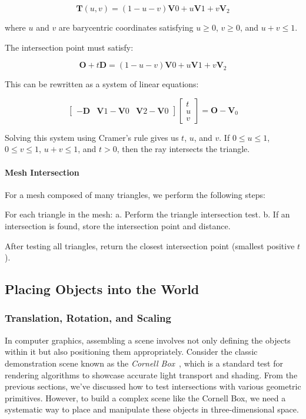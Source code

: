 \documentclass[12pt]{article}
\begin{document}
\[
    \mathbf{T}(u,v) = (1-u-v)\mathbf{V}0 + u\mathbf{V}1 + v\mathbf{V}_2
\]

where \(u\) and \(v\) are barycentric coordinates satisfying \(u \geq 0\), \(v \geq 0\), and \(u + v \leq 1\).

The intersection point must satisfy:

\[
    \mathbf{O} + t\mathbf{D} = (1-u-v)\mathbf{V}0 + u\mathbf{V}1 + v\mathbf{V}_2
\]

This can be rewritten as a system of linear equations:

\[
    \begin{bmatrix}
        -\mathbf{D} & \mathbf{V}1 - \mathbf{V}0 & \mathbf{V}2 - \mathbf{V}0
    \end{bmatrix}
    \begin{bmatrix}
        t \\ u \\ v
    \end{bmatrix}
    = \mathbf{O} - \mathbf{V}_0
\]

Solving this system using Cramer's rule gives us \(t\), \(u\), and \(v\). If \(0 \leq u \leq 1\), \(0 \leq v \leq 1\), \(u + v \leq 1\), and \(t > 0\), then the ray intersects the triangle.

\paragraph{Mesh Intersection}

For a mesh composed of many triangles, we perform the following steps:

For each triangle in the mesh:
a. Perform the triangle intersection test.
b. If an intersection is found, store the intersection point and distance.

After testing all triangles, return the closest intersection point (smallest positive \(t\)).

\subsection{Placing Objects into the World}
\subsubsection{Translation, Rotation, and Scaling}

In computer graphics, assembling a scene involves not only defining the objects within it but also positioning them appropriately. Consider the classic demonstration scene known as the \textit{Cornell Box}~\cite{cornellbox}, which is a standard test for rendering algorithms to showcase accurate light transport and shading.
From the previous sections, we've discussed how to test intersections with various geometric primitives. However, to build a complex scene like the Cornell Box, we need a systematic way to place and manipulate these objects in three-dimensional space.
\end{document}
